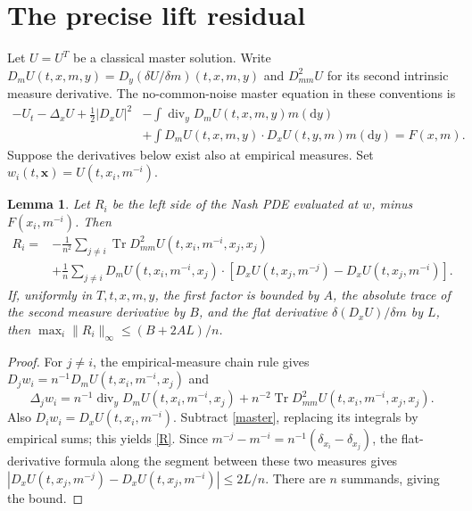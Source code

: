 \documentclass[11pt]{article}
\newtheorem{lemma}[theorem]{Lemma}
\newcommand{\dd}{\mathrm d}
\begin{document}
\section{The precise lift residual}
Let $U=U^T$ be a classical master solution. Write $D_mU(t,x,m,y)=D_y(\delta U/\delta m)(t,x,m,y)$ and $D^2_{mm}U$ for its second intrinsic measure derivative. The no-common-noise master equation in these conventions is
\begin{align}\label{master}
 -U_t-\Delta_xU+\tfrac12|D_xU|^2
 &-\int\operatorname{div}_yD_mU(t,x,m,y)m(\dd y)\nonumber\\
 &+\int D_mU(t,x,m,y)\cdot D_xU(t,y,m)m(\dd y)=F(x,m).
\end{align}
Suppose the derivatives below exist also at empirical measures. Set $w_i(t,\boldsymbol x)=U(t,x_i,m^{-i})$.
\begin{lemma}\label{residual}
Let $R_i$ be the left side of the Nash PDE evaluated at $w$, minus $F(x_i,m^{-i})$. Then
\begin{align}\label{R}
 R_i={}&-\frac1{n^2}\sum_{j\ne i}\operatorname{Tr}D^2_{mm}U(t,x_i,m^{-i},x_j,x_j)\\
 &+\frac1n\sum_{j\ne i}D_mU(t,x_i,m^{-i},x_j)\cdot
 [D_xU(t,x_j,m^{-j})-D_xU(t,x_j,m^{-i})].\nonumber
\end{align}
If, uniformly in $T,t,x,m,y$, the first factor is bounded by $A$, the absolute trace of the second measure derivative by $B$, and the flat derivative $\delta(D_xU)/\delta m$ by $L$, then
$\max_i\|R_i\|_\infty\le(B+2AL)/n$.
\end{lemma}
\begin{proof}
For $j\ne i$, the empirical-measure chain rule gives
$D_jw_i=n^{-1}D_mU(t,x_i,m^{-i},x_j)$ and
\[
 \Delta_jw_i=n^{-1}\operatorname{div}_yD_mU(t,x_i,m^{-i},x_j)
 +n^{-2}\operatorname{Tr}D^2_{mm}U(t,x_i,m^{-i},x_j,x_j).
\]
Also $D_iw_i=D_xU(t,x_i,m^{-i})$. Subtract \eqref{master}, replacing its integrals by empirical sums; this yields \eqref{R}. Since
$m^{-j}-m^{-i}=n^{-1}(\delta_{x_i}-\delta_{x_j})$, the flat-derivative formula along the segment between these two measures gives
$|D_xU(t,x_j,m^{-j})-D_xU(t,x_j,m^{-i})|\le2L/n$.
There are $n$ summands, giving the bound.
\end{proof}
\end{document}
